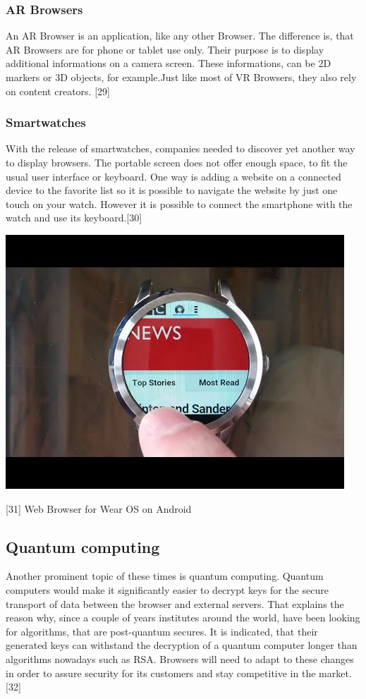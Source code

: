 \documentclass[runningheads]{llncs}
\begin{document}
			\subsubsection{AR Browsers}
				\leavevmode\newline
				An AR Browser is an application, like any other Browser. The difference is, that AR Browsers are for phone or tablet use only. Their purpose is to display additional informations on a camera screen. These informations, can be 2D markers or 3D objects, for example.Just like most of VR Browsers, they also rely on content creators.
				[29]
			\subsubsection{Smartwatches}
			\leavevmode\newline
			With the release of smartwatches, companies needed to discover yet another way to display browsers. The portable screen does not offer enough space, to fit the usual user interface or keyboard. One way is adding a website on a connected device to the favorite list so it is possible to navigate the website by just one touch on your watch.
			 However it is possible to connect the smartphone with the watch and use its keyboard.[30]
			\begin{center}
				\includegraphics[scale=0.35]{Smartwatch.jpg}

				[31] Web Browser for Wear OS on Android
			\end{center}
		\subsection{Quantum computing}
		\leavevmode\newline
		Another prominent topic of these times is quantum computing. Quantum computers would make it significantly easier to decrypt keys for the secure transport of data between the browser and external servers. That explains the reason why, since a couple of years institutes around the world, have been looking for algorithms, that are post-quantum secures. It is indicated, that their generated keys can withstand the decryption of a quantum computer longer than algorithms nowadays such as RSA. Browsers will need to adapt to these changes in order to assure security for its customers and stay competitive in the market.
			[32]
\end{document}
